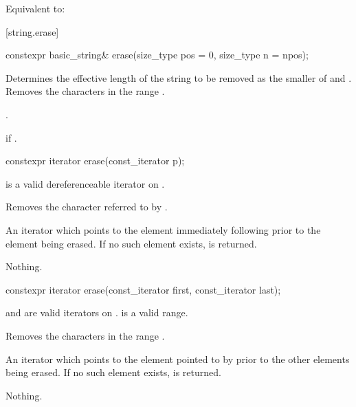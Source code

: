 \begin{itemdescr}
\pnum
\effects
Equivalent to: 
\end{itemdescr}

[string.erase]{}

%
\begin{itemdecl}
constexpr basic_string& erase(size_type pos = 0, size_type n = npos);
\end{itemdecl}

\begin{itemdescr}
\pnum
\effects
Determines the effective length 
of the string to be removed as the smaller of  and
.
Removes the characters in the range .

\pnum
\returns
{}.

\pnum
\throws
{}
if 
.
\end{itemdescr}

%
\begin{itemdecl}
constexpr iterator erase(const_iterator p);
\end{itemdecl}

\begin{itemdescr}
\pnum
\expects
{} is a valid dereferenceable iterator on .

\pnum
\effects
Removes the character referred to by .

\pnum
\returns
An iterator which points to the element immediately following  prior to
the element being erased.
If no such element exists,
is returned.

\pnum
\throws
Nothing.
\end{itemdescr}

%
\begin{itemdecl}
constexpr iterator erase(const_iterator first, const_iterator last);
\end{itemdecl}

\begin{itemdescr}
\pnum
\expects
{} and  are valid iterators on
.  is a valid range.

\pnum
\effects
Removes the characters in the range
\tcode{[first, last)}.

\pnum
\returns
An iterator which points to the element pointed to by  prior to
the other elements being erased.
If no such element exists,
is returned.

\pnum
\throws
Nothing.
\end{itemdescr}

